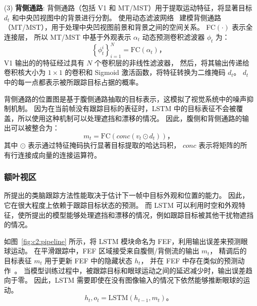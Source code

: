 (3) \textbf{背侧通路}: 
背侧通路（包括 V1 和 MT/MST）用于提取运动特征，将显著目标 $d_t$ 和中央凹视图中的背景进行分割。
使用动态滤波网络~\cite{brabandere2016dynamic} 建模背侧通路（MT/MST），用于处理中央凹视图前景和背景之间的空间关系。
FC$(\cdot)$ 表示全连接层，
所以 MT/MST 中基于外观表示 $\alpha_t$ 动态预测卷积滤波器 $\phi_t$ 为：
\begin{equation}
\left\{ \phi _t ^i \right\}_{i=1}^N = \text{FC}(\alpha_t) \mbox{，}
\end{equation}
V1 输出的的特征经过具有 $N$ 个卷积层的非线性滤波器，
然后，将其输出传递给卷积核大小为 $1 \times 1$ 的卷积和 Sigmoid 激活函数，将特征转换为二维掩码 $d_t$。
$d_t$ 中的每一点都表示被所跟踪目标占据的概率。

背侧通路的位置图是基于腹侧通路抽取的目标表示，这模拟了视觉系统中的噪声抑制机制。
因为在当前帧没有跟踪目标的表征时，LSTM 中的目标表征不会被覆盖，所以使用这种机制可以处理遮挡和漂移的情况。
因此，腹侧和背侧通路的输出可以被整合为：
\begin{equation}
m_t = \text{FC}(conc(v_t \odot d_t)) \mbox{，}
\end{equation}
其中 $\odot$ 表示通过特征掩码执行显著目标提取的哈达玛积，
$conc$ 表示将矩阵的所有行连接成向量的连接运算符。


\subsubsection{额叶视区}
所提出的类脑跟踪方法性能取决于估计下一帧中目标外观和位置的能力。
因此，它在很大程度上依赖于跟踪目标状态的预测。
而 LSTM 可以利用时空和外观特征，使所提出的模型能够处理遮挡和漂移的情况，例如跟踪目标被其他干扰物遮挡的情况。

如图~\ref{fig:c2:pipeline} 所示，将 LSTM 模块命名为 FEF，利用输出误差来预测眼球运动。
在平滑跟踪中，FEF 区域接受来自腹侧/背侧流的输出 $m_t$，
精调后的目标表征 $m_t$ 用于更新 FEF 中的隐藏状态 $h_t$，
并在 FEF 中存在类似的预测动作~\cite{b11,b13,b14}。
当模型训练过程中，被跟踪目标和眼球运动之间的延迟减少时，输出误差趋向于零。
因此，LSTM 需要即使在没有图像输入的情况下依然能够推断眼球的运动。
\begin{equation} \label{equ:c2:LSTM}
h_t, o_t = \text{LSTM}(h_{t-1}, m_t) \mbox{。}
\end{equation}


